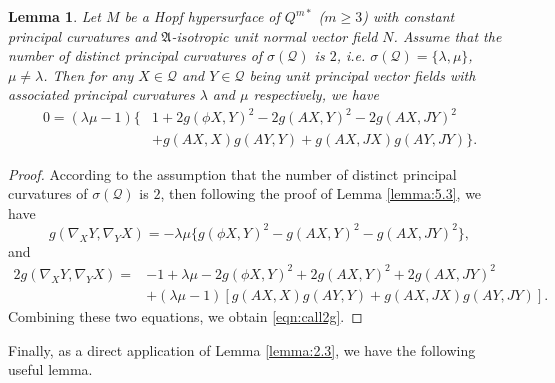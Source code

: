 \documentclass[reqno]{amsart}%
\newtheorem{lemma}[theorem]{Lemma}
\theoremstyle{definition}
\numberwithin{equation}{section}
\begin{document}
\begin{lemma}\label{lemma:4.1aa}
Let $M$ be a Hopf hypersurface of $Q^{m*}$ ($m\geq3$) with constant principal curvatures and $\mathfrak{A}$-isotropic unit normal vector field $N$. Assume that the number of distinct principal curvatures of $\sigma(\mathcal{Q})$ is $2$, i.e.
$\sigma(\mathcal{Q})=\{\lambda,\mu\}$, $\mu\neq\lambda$. Then for any $X\in \mathcal{Q}$ and $Y\in \mathcal{Q}$ being unit principal vector fields with
associated principal curvatures $\lambda$ and $\mu$ respectively, we have
%
\begin{equation}\label{eqn:call2g}
\begin{aligned}
0=(\lambda\mu -1)\Big\{&1+2g(\phi X,Y)^2-2g(AX,Y)^2-2g(AX,JY)^2\\
&+g(AX,X)g(AY,Y)+g(AX,JX)g(AY,JY)\Big\}.
\end{aligned}
\end{equation}
\end{lemma}
%
\begin{proof}
According to the assumption that the number of distinct principal curvatures of $\sigma(\mathcal{Q})$ is $2$, then following the
proof of Lemma \ref{lemma:5.3}, we have
$$
g(\nabla_X Y,\nabla_Y X)=-\lambda\mu\Big\{g(\phi X,Y)^2-g(AX,Y)^2-g(AX,JY)^2\Big\},
$$
and
$$
\begin{aligned}
2g(\nabla_X Y,\nabla_Y X)=&-1+\lambda\mu-2g(\phi X,Y)^2+2g(AX,Y)^2+2g(AX,JY)^2\\
&+(\lambda\mu-1)[g(AX,X)g(AY,Y)+g(AX,JX)g(AY,JY)].
\end{aligned}
$$
Combining these two equations, we obtain \eqref{eqn:call2g}.
\end{proof}

Finally, as a direct application of Lemma \ref{lemma:2.3},
we have the following useful lemma.
\end{document}
